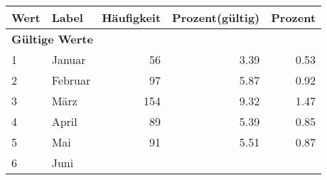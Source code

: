      \begin{longtable}{lXrrr}
     \toprule
     \textbf{Wert} & \textbf{Label} & \textbf{Häufigkeit} & \textbf{Prozent(gültig)} & \textbf{Prozent} \\
     \endhead
     \midrule
     \multicolumn{5}{l}{\textbf{Gültige Werte}}\\

     1 &
     \multicolumn{1}{X}{ Januar   } &


       \num{56} &
       \num[round-mode=places,round-precision=2]{3,39} &
         \num[round-mode=places,round-precision=2]{0,53} \\

     2 &
     \multicolumn{1}{X}{ Februar   } &


       \num{97} &
       \num[round-mode=places,round-precision=2]{5,87} &
         \num[round-mode=places,round-precision=2]{0,92} \\

     3 &
     \multicolumn{1}{X}{ März   } &


       \num{154} &
       \num[round-mode=places,round-precision=2]{9,32} &
         \num[round-mode=places,round-precision=2]{1,47} \\

     4 &
     \multicolumn{1}{X}{ April   } &


       \num{89} &
       \num[round-mode=places,round-precision=2]{5,39} &
         \num[round-mode=places,round-precision=2]{0,85} \\

     5 &
     \multicolumn{1}{X}{ Mai   } &


       \num{91} &
       \num[round-mode=places,round-precision=2]{5,51} &
         \num[round-mode=places,round-precision=2]{0,87} \\

     6 &
     \multicolumn{1}{X}{ Juni   } &



\end{longtable}
